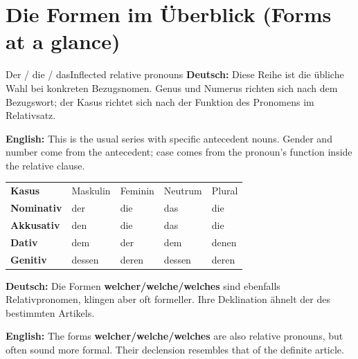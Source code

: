 \documentclass[a4paper,11pt]{article}
\newcommand{\GermanText}[1]{\textbf{Deutsch: }#1\par}
\newcommand{\EnglishText}[1]{{\small\color{SoftGray}\textbf{English: }#1\par}}
\begin{document}
\section{Die Formen im Überblick (Forms at a glance)}
\begin{grammarentry}{Der / die / das}{Inflected relative pronouns}
\GermanText{Diese Reihe ist die übliche Wahl bei konkreten Bezugsnomen. Genus und Numerus richten sich nach dem Bezugswort; der Kasus richtet sich nach der Funktion des Pronomens im Relativsatz.}
\EnglishText{This is the usual series with specific antecedent nouns. Gender and number come from the antecedent; case comes from the pronoun's function inside the relative clause.}
\end{grammarentry}
\begin{center}
\begin{tabular}{>{\bfseries}p{2.2cm}|>{\centering\arraybackslash}p{2.2cm}|>{\centering\arraybackslash}p{2.2cm}|>{\centering\arraybackslash}p{2.2cm}|>{\centering\arraybackslash}p{2.2cm}}
\rowcolor{HeaderBlueDark}
\color{white}Kasus & \color{white}Maskulin & \color{white}Feminin & \color{white}Neutrum & \color{white}Plural\\
Nominativ & der & die & das & die\\
Akkusativ & den & die & das & die\\
Dativ & dem & der & dem & denen\\
Genitiv & dessen & deren & dessen & deren\\
\end{tabular}
\end{center}
\GermanText{Die Formen \textbf{welcher/welche/welches} sind ebenfalls Relativpronomen, klingen aber oft formeller. Ihre Deklination ähnelt der des bestimmten Artikels.}
\EnglishText{The forms \textbf{welcher/welche/welches} are also relative pronouns, but often sound more formal. Their declension resembles that of the definite article.}
\end{document}
